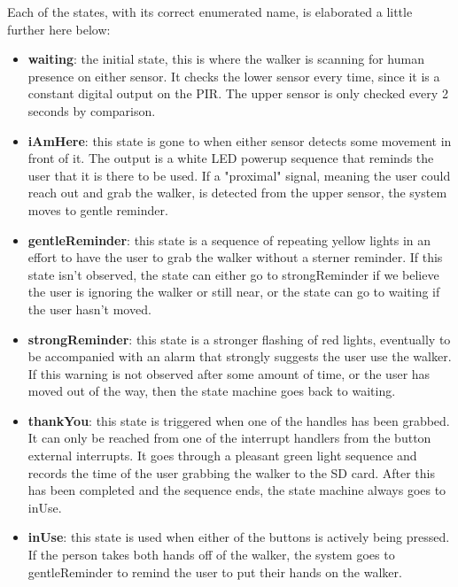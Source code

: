 \documentclass{article}
\begin{document}
Each of the states, with its correct enumerated name, is elaborated a little further here below: 

\begin{itemize}
	\item \textbf{waiting}: the initial state, this is where the walker is scanning for human presence on either sensor. It checks the lower sensor every time, since it is a constant digital output on the PIR. The upper sensor is only checked every 2 seconds by comparison. 
	\item \textbf{iAmHere}: this state is gone to when either sensor detects some movement in front of it. The output is a white LED powerup sequence that reminds the user that it is there to be used. If a "proximal" signal, meaning the user could reach out and grab the walker, is detected from the upper sensor, the system moves to gentle reminder. 
	\item \textbf{gentleReminder}: this state is a sequence of repeating yellow lights in an effort to have the user to grab the walker without a sterner reminder. If this state isn't observed, the state can either go to strongReminder if we believe the user is ignoring the walker or still near, or the state can go to waiting if the user hasn't moved. 
	\item \textbf{strongReminder}: this state is a stronger flashing of red lights, eventually to be accompanied with an alarm that strongly suggests the user use the walker. If this warning is not observed after some amount of time, or the user has moved out of the way, then the state machine goes back to waiting. 
	\item \textbf{thankYou}: this state is triggered when one of the handles has been grabbed. It can only be reached from one of the interrupt handlers from the button external interrupts. It goes through a pleasant green light sequence and records the time of the user grabbing the walker to the SD card. After this has been completed and the sequence ends, the state machine always goes to inUse. 
	\item \textbf{inUse}: this state is used when either of the buttons is actively being pressed. If the person takes both hands off of the walker, the system goes to gentleReminder to remind the user to put their hands on the walker. 
\end{itemize}

\end{document}
